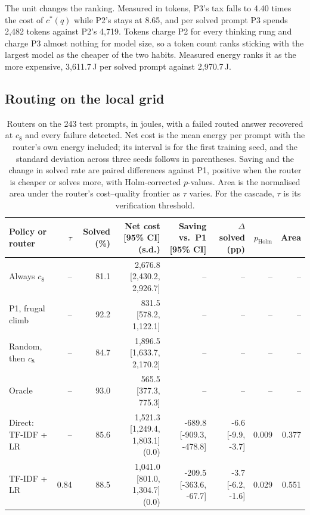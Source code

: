 \documentclass[final,5p,times,twocolumn]{elsarticle}
\theoremstyle{plain}
\newcommand{\cstar}{c^{*}}
\begin{document}
The unit changes the ranking. Measured in tokens, P3's tax falls to 4.40
times the cost of $\cstar(q)$ while P2's stays at 8.65, and per solved prompt
P3 spends 2{,}482 tokens against P2's 4{,}719. Tokens charge P2 for every
thinking rung and charge P3 almost nothing for model size, so a token count
ranks sticking with the largest model as the cheaper of the two habits.
Measured energy ranks it as the more expensive, 3{,}611.7\,J per solved
prompt against 2{,}970.7\,J.

\subsection{Routing on the local grid}
\label{sec:results-routing}

\begin{table}[ht]
\centering
\scriptsize
\caption{Routers on the 243 test prompts, in joules, with a failed routed
answer recovered at $c_8$ and every failure detected. Net cost is the mean
energy per prompt with the router's own energy included; its interval is for
the first training seed, and the standard deviation across three seeds
follows in parentheses. Saving and the change in solved rate are paired
differences against P1, positive when the router is cheaper or solves more,
with Holm-corrected $p$-values. Area is the normalised area under the
router's cost--quality frontier as $\tau$ varies. For the cascade, $\tau$ is
its verification threshold.}
\label{tab:routers}
\setlength{\tabcolsep}{4pt}
\begin{tabular}{@{}lrrrrrrr@{}}
\toprule
Policy or router & $\tau$ & Solved (\%) & Net cost [95\% CI] (s.d.) & Saving vs.\ P1 [95\% CI] & $\Delta$ solved (pp) & $p_{\mathrm{Holm}}$ & Area \\
\midrule
Always $c_8$ & -- & 81.1 & 2{,}676.8 [2{,}430.2, 2{,}926.7] & -- & -- & -- & -- \\
P1, frugal climb & -- & 92.2 & 831.5 [578.2, 1{,}122.1] & -- & -- & -- & -- \\
Random, then $c_8$ & -- & 84.7 & 1{,}896.5 [1{,}633.7, 2{,}170.2] & -- & -- & -- & -- \\
Oracle & -- & 93.0 & 565.5 [377.3, 775.3] & -- & -- & -- & -- \\
\midrule
Direct: TF-IDF + LR & -- & 85.6 & 1{,}521.3 [1{,}249.4, 1{,}803.1] (0.0) & -689.8 [-909.3, -478.8] & -6.6 [-9.9, -3.7] & 0.009 & 0.377 \\
TF-IDF + LR & 0.84 & 88.5 & 1{,}041.0 [801.0, 1{,}304.7] (0.0) & -209.5 [-363.6, -67.7] & -3.7 [-6.2, -1.6] & 0.029 & 0.551 \\

\end{tabular}
\end{table}
\end{document}
